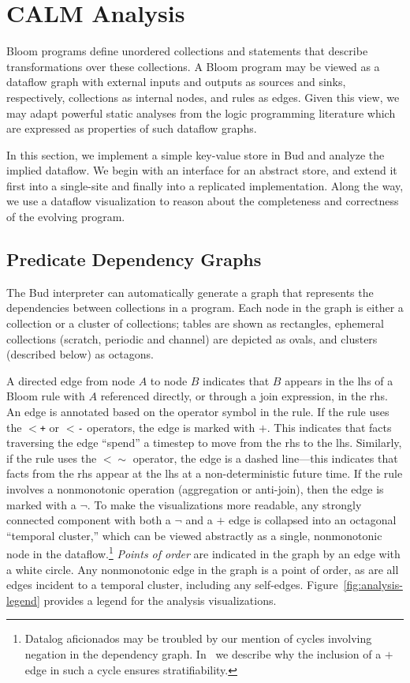 \section{CALM Analysis}
Bloom programs define unordered collections and statements that describe
transformations over these collections.  A Bloom program may be viewed as a
dataflow graph with external inputs and outputs as sources and sinks,
respectively, collections as internal nodes, and rules as edges.  Given this
view, we may adapt powerful static analyses from the logic programming
literature which are expressed as properties of such dataflow graphs.

In this section, we implement a simple key-value store in Bud and analyze the
implied dataflow.  We begin with an interface for an abstract store, and extend
it first into a single-site and finally into a replicated implementation.  Along
the way, we use a dataflow visualization to reason about the completeness and
correctness of the evolving program.


\subsection{Predicate Dependency Graphs}
The Bud interpreter can automatically generate a graph that represents the
dependencies between collections in a program. Each node in the graph is either
a collection or a cluster of collections; tables are shown as rectangles,
ephemeral collections (scratch, periodic and channel) are depicted as ovals, and
clusters (described below) as octagons.

A directed edge from node $A$ to node $B$ indicates that $B$ appears in the lhs
of a Bloom rule with $A$ referenced directly, or through a join expression, in
the rhs.  An edge is annotated based on the operator symbol in the rule. If the
rule uses the \texttt{$<$+} or \texttt{$<$-} operators, the edge is marked with
$+$. This indicates that facts traversing the edge ``spend'' a timestep to move
from the rhs to the lhs. Similarly, if the rule uses the \texttt{$<\sim$}
operator, the edge is a dashed line---this indicates that facts from the rhs
appear at the lhs at a non-deterministic future time. If the rule involves a
nonmonotonic operation (aggregation or anti-join), then the edge is marked with
a $\lnot$.  To make the visualizations more readable, any strongly connected
component with both a $\lnot$ and a $+$ edge is collapsed into an octagonal
``temporal cluster,'' which can be viewed abstractly as a single, nonmonotonic
node in the dataflow.\footnote{Datalog aficionados may be troubled by our
  mention of cycles involving negation in the dependency graph.
  In~\cite{dedalus} we describe why the inclusion of a $+$ edge in such a cycle
  ensures stratifiability.}  \emph{Points of order} are indicated in the graph
by an edge with a white circle.  Any nonmonotonic edge in the graph is a point
of order, as are all edges incident to a temporal cluster, including any
self-edges.  Figure~\ref{fig:analysis-legend} provides a legend for the analysis
visualizations.

